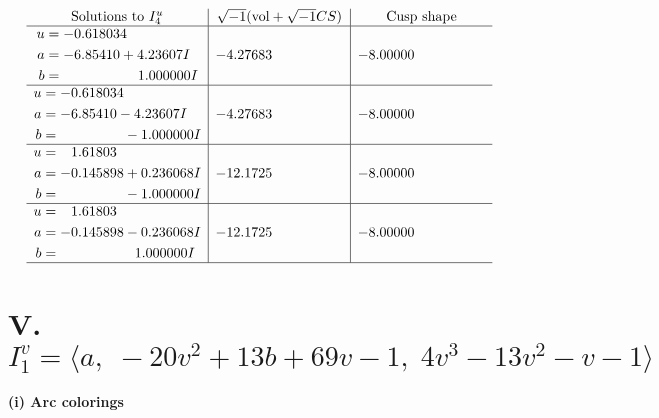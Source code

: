 \documentclass[1p]{elsarticle_modified}
\theoremstyle{definition}
\newcommand{\I}{\sqrt{-1}}
\begin{document}
$$\begin{array}{c|c|c}  
\text{Solutions to }I^u_{4}& \I (\text{vol} + \sqrt{-1}CS) & \text{Cusp shape}\\
 \hline 
\begin{aligned}
u &= -0.618034\phantom{ +0.000000I} \\
a &= -6.85410 + 4.23607 I \\
b &= \phantom{-0.000000 -}1.000000 I\end{aligned}
 & -4.27683\phantom{ +0.000000I} & -8.00000\phantom{ +0.000000I} \\ \hline\begin{aligned}
u &= -0.618034\phantom{ +0.000000I} \\
a &= -6.85410 - 4.23607 I \\
b &= \phantom{-0.000000 } -1.000000 I\end{aligned}
 & -4.27683\phantom{ +0.000000I} & -8.00000\phantom{ +0.000000I} \\ \hline\begin{aligned}
u &= \phantom{-}1.61803\phantom{ +0.000000I} \\
a &= -0.145898 + 0.236068 I \\
b &= \phantom{-0.000000 } -1.000000 I\end{aligned}
 & -12.1725\phantom{ +0.000000I} & -8.00000\phantom{ +0.000000I} \\ \hline\begin{aligned}
u &= \phantom{-}1.61803\phantom{ +0.000000I} \\
a &= -0.145898 - 0.236068 I \\
b &= \phantom{-0.000000 -}1.000000 I\end{aligned}
 & -12.1725\phantom{ +0.000000I} & -8.00000\phantom{ +0.000000I}\\
 \hline 
 \end{array}$$\newpage\newpage\renewcommand{\arraystretch}{1}
\centering \section*{V. $I^v_{1}= \langle a,\;-20 v^2+13 b+69 v-1,\;4 v^3-13 v^2- v-1 \rangle$}
\flushleft \textbf{(i) Arc colorings}\\
\end{document}
